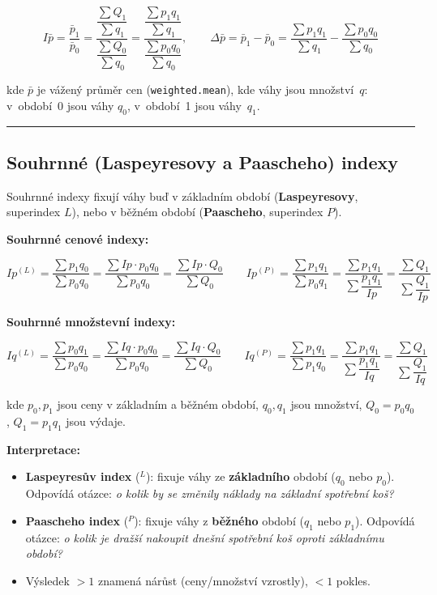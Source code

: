\documentclass[a4paper, 11pt]{article}
\begin{document}
\begin{equation*}
	I\bar{p} = \frac{\bar{p}_1}{\bar{p}_0}
	= \frac{\dfrac{\sum Q_1}{\sum q_1}}{\dfrac{\sum Q_0}{\sum q_0}}
	= \frac{\dfrac{\sum p_1 q_1}{\sum q_1}}{\dfrac{\sum p_0 q_0}{\sum q_0}},
	\qquad
	\Delta\bar{p} = \bar{p}_1 - \bar{p}_0
	= \frac{\sum p_1 q_1}{\sum q_1} - \frac{\sum p_0 q_0}{\sum q_0}
\end{equation*}

kde $\bar{p}$ je vážený průměr cen (\texttt{weighted.mean}),
kde váhy jsou množství~$q$: v~období~0 jsou váhy $q_0$, v~období~1 jsou váhy~$q_1$.

\noindent\hrule\medskip

\subsection{Souhrnné (Laspeyresovy a Paascheho) indexy}

Souhrnné indexy fixují váhy buď v základním období (\textbf{Laspeyresovy}, superindex $L$),
nebo v běžném období (\textbf{Paascheho}, superindex $P$).

\medskip
\noindent\textbf{Souhrnné cenové indexy:}

\begin{equation*}
	Ip^{(L)} = \frac{\sum p_1 q_0}{\sum p_0 q_0}
	= \frac{\sum Ip \cdot p_0 q_0}{\sum p_0 q_0}
	= \frac{\sum Ip \cdot Q_0}{\sum Q_0}
	\qquad
	Ip^{(P)} = \frac{\sum p_1 q_1}{\sum p_0 q_1}
	= \frac{\sum p_1 q_1}{\sum \dfrac{p_1 q_1}{Ip}}
	= \frac{\sum Q_1}{\sum \dfrac{Q_1}{Ip}}
\end{equation*}

\medskip
\noindent\textbf{Souhrnné množstevní indexy:}

\begin{equation*}
	Iq^{(L)} = \frac{\sum p_0 q_1}{\sum p_0 q_0}
	= \frac{\sum Iq \cdot p_0 q_0}{\sum p_0 q_0}
	= \frac{\sum Iq \cdot Q_0}{\sum Q_0}
	\qquad
	Iq^{(P)} = \frac{\sum p_1 q_1}{\sum p_1 q_0}
	= \frac{\sum p_1 q_1}{\sum \dfrac{p_1 q_1}{Iq}}
	= \frac{\sum Q_1}{\sum \dfrac{Q_1}{Iq}}
\end{equation*}

kde $p_0, p_1$ jsou ceny v základním a běžném období, $q_0, q_1$ jsou množství,
$Q_0 = p_0 q_0$, $Q_1 = p_1 q_1$ jsou výdaje.

\medskip
\noindent\textbf{Interpretace:}
\begin{itemize}[noitemsep]
	\item \textbf{Laspeyresův index} (${}^L$): fixuje váhy ze \textbf{základního} období ($q_0$ nebo $p_0$). Odpovídá otázce: \emph{o kolik by se změnily náklady na základní spotřební koš?}
	\item \textbf{Paascheho index} (${}^P$): fixuje váhy z \textbf{běžného} období ($q_1$ nebo $p_1$). Odpovídá otázce: \emph{o kolik je dražší nakoupit dnešní spotřební koš oproti základnímu období?}
	\item Výsledek $> 1$ znamená nárůst (ceny/množství vzrostly), $< 1$ pokles.
\end{itemize}
\end{document}
